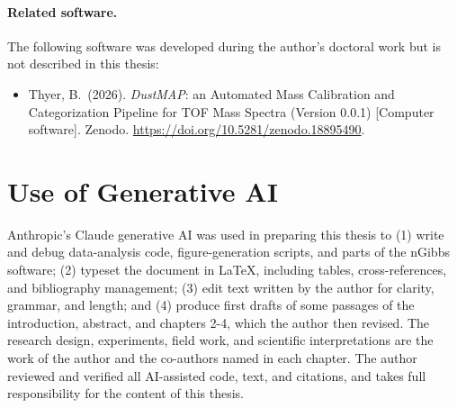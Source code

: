 \paragraph{Related software.} The following software was developed during the
author's doctoral work but is not described in this thesis:
\begin{itemize}
  \item Thyer, B.\ (2026). \textit{DustMAP}: an Automated Mass Calibration and
        Categorization Pipeline for TOF Mass Spectra (Version 0.0.1) [Computer software].
        Zenodo. \url{https://doi.org/10.5281/zenodo.18895490}.
\end{itemize}

\section*{Use of Generative AI}

Anthropic's Claude generative AI was used in preparing this
thesis to (1) write and debug data-analysis code, figure-generation scripts, and
parts of the nGibbs software; (2) typeset the document in \LaTeX{}, including
tables, cross-references, and bibliography management; (3) edit text written by
the author for clarity, grammar, and length; and (4) produce first drafts of some
passages of the introduction, abstract, and chapters 2-4, which the author then revised.
The research design, experiments, field work, and scientific interpretations are
the work of the author and the co-authors named in each chapter. The author
reviewed and verified all AI-assisted code, text, and citations, and takes full
responsibility for the content of this thesis.
